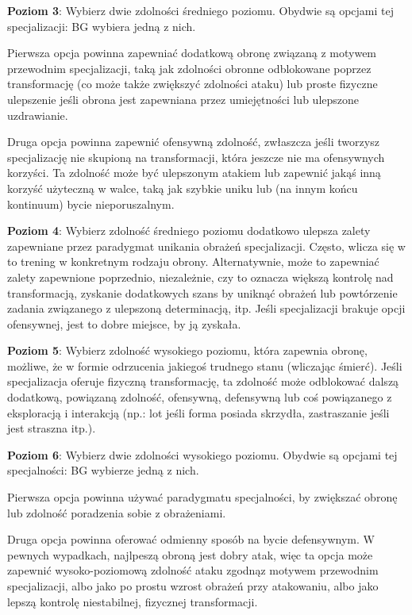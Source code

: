 \textbf{Poziom 3}: Wybierz dwie zdolności średniego poziomu. Obydwie są opcjami tej specjalizacji: BG wybiera jedną z nich.

Pierwsza opcja powinna zapewniać dodatkową obronę związaną z motywem przewodnim specjalizacji, taką jak zdolności obronne odblokowane poprzez transformację (co może także zwiększyć zdolności ataku) lub proste fizyczne ulepszenie jeśli obrona jest zapewniana przez umiejętności lub ulepszone uzdrawianie.

Druga opcja powinna zapewnić ofensywną zdolność, zwłaszcza jeśli tworzysz specjalizację nie skupioną na transformacji, która jeszcze nie ma ofensywnych korzyści. Ta zdolność może być ulepszonym atakiem lub zapewnić jakąś inną korzyść użyteczną w walce, taką jak szybkie uniku lub (na innym końcu kontinuum) bycie nieporuszalnym.

\textbf{Poziom 4}: Wybierz zdolność średniego poziomu dodatkowo ulepsza zalety zapewniane przez paradygmat unikania obrażeń specjalizacji. Często, wlicza się w to trening w konkretnym rodzaju obrony. Alternatywnie, może to zapewniać zalety zapewnione poprzednio, niezależnie, czy to oznacza większą kontrolę nad transformacją, zyskanie dodatkowych szans by uniknąć obrażeń lub powtórzenie zadania związanego z ulepszoną determinacją, itp. Jeśli specjalizacji brakuje opcji ofensywnej, jest to dobre miejsce, by ją zyskała.

\textbf{Poziom 5}: Wybierz zdolność wysokiego poziomu, która zapewnia obronę, możliwe, że w formie odrzucenia jakiegoś trudnego stanu (wliczając śmierć). Jeśli specjalizacja oferuje fizyczną transformację, ta zdolność może odblokować dalszą dodatkową, powiązaną zdolność, ofensywną, defensywną lub coś powiązanego z eksploracją i interakcją (np.: lot jeśli forma posiada skrzydła, zastraszanie jeśli jest straszna itp.).

\textbf{Poziom 6}: Wybierz dwie zdolności wysokiego poziomu. Obydwie są opcjami tej specjalności: BG wybierze jedną z nich.

Pierwsza opcja powinna używać paradygmatu specjalności, by zwiększać obronę lub zdolność poradzenia sobie z obrażeniami.

Druga opcja powinna oferować odmienny sposób na bycie defensywnym. W pewnych wypadkach, najlpeszą obroną jest dobry atak, więc ta opcja może zapewnić wysoko-poziomową zdolność ataku zgodnąz motywem przewodnim specjalizacji, albo jako po prostu wzrost obrażeń przy atakowaniu, albo jako lepszą kontrolę niestabilnej, fizycznej transformacji.

